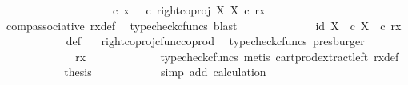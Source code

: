 \begin{isabellebody}
\ \ \ \ \ \ \isamarkupfalse%
\ {\isacharminus}{\kern0pt}\ \isanewline
\ \ \ \ \ \ \ \ \isamarkupfalse%
\ {\isachardoublequoteopen}{\isasymrho}\ {\isasymcirc}\isactrlsub c\ x\ {\isacharequal}{\kern0pt}\ {\isacharparenleft}{\kern0pt}{\isasymrho}\ {\isasymcirc}\isactrlsub c\ right{\isacharunderscore}{\kern0pt}coproj\ X\ X{\isacharparenright}{\kern0pt}\ {\isasymcirc}\isactrlsub c\ rx{\isachardoublequoteclose}\isanewline
\ \ \ \ \ \ \ \ \ \ \isamarkupfalse%
\ comp{\isacharunderscore}{\kern0pt}associative{}\ rx{\isacharunderscore}{\kern0pt}def\ \isamarkupfalse%
\ {\isacharparenleft}{\kern0pt}typecheck{\isacharunderscore}{\kern0pt}cfuncs{\isacharcomma}{\kern0pt}\ blast{\isacharparenright}{\kern0pt}\isanewline
\ \ \ \ \ \ \ \ \isamarkupfalse%
\ \isamarkupfalse%
\ {\isachardoublequoteopen}{\isachardot}{\kern0pt}{\isachardot}{\kern0pt}{\isachardot}{\kern0pt}\ {\isacharequal}{\kern0pt}\ {\isasymlangle}id\ X{\isacharcomma}{\kern0pt}\ {\isasymf}\ {\isasymcirc}\isactrlsub c\ {\isasymbeta}\isactrlbsub X\isactrlesub {\isasymrangle}\ \ {\isasymcirc}\isactrlsub c\ rx{\isachardoublequoteclose}\isanewline
\ \ \ \ \ \ \ \ \ \ \isamarkupfalse%
\ {\isasymrho}{\isacharunderscore}{\kern0pt}def\ \ \isamarkupfalse%
\ right{\isacharunderscore}{\kern0pt}coproj{\isacharunderscore}{\kern0pt}cfunc{\isacharunderscore}{\kern0pt}coprod\ \isamarkupfalse%
\ {\isacharparenleft}{\kern0pt}typecheck{\isacharunderscore}{\kern0pt}cfuncs{\isacharcomma}{\kern0pt}\ presburger{\isacharparenright}{\kern0pt}\isanewline
\ \ \ \ \ \ \ \ \isamarkupfalse%
\ \isamarkupfalse%
\ {\isachardoublequoteopen}{\isachardot}{\kern0pt}{\isachardot}{\kern0pt}{\isachardot}{\kern0pt}\ {\isacharequal}{\kern0pt}\ {\isasymlangle}rx{\isacharcomma}{\kern0pt}\ {\isasymf}{\isasymrangle}{\isachardoublequoteclose}\isanewline
\ \ \ \ \ \ \ \ \ \ \isamarkupfalse%
\ {\isacharparenleft}{\kern0pt}typecheck{\isacharunderscore}{\kern0pt}cfuncs{\isacharcomma}{\kern0pt}\ metis\ cart{\isacharunderscore}{\kern0pt}prod{\isacharunderscore}{\kern0pt}extract{\isacharunderscore}{\kern0pt}left\ rx{\isacharunderscore}{\kern0pt}def{\isacharparenright}{\kern0pt}\isanewline
\ \ \ \ \ \ \ \ \isamarkupfalse%
\ \isamarkupfalse%
\ {\isacharquery}{\kern0pt}thesis\isanewline
\ \ \ \ \ \ \ \ \ \ \isamarkupfalse%
\ {\isacharparenleft}{\kern0pt}simp\ add{\isacharcolon}{\kern0pt}\ calculation{\isacharparenright}{\kern0pt}\isanewline

\end{isabellebody}

